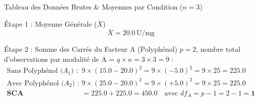 \documentclass[11pt,a4paper]{article}
\begin{document}
\begin{stepbox}{Tableau des Données Brutes \& Moyennes par Condition ($n=3$)}
\begin{center}
\end{center}
\end{stepbox}

\begin{stepbox}{Étape 1 : Moyenne Générale ($\bar{X}$)}
\begin{equation*}
\bar{X} = 20.0\,\text{U/mg}
\end{equation*}
\end{stepbox}

\begin{stepbox}{Étape 2 : Somme des Carrés du Facteur A (Polyphénol)}
$p = 2$, nombre total d'observations par modalité de A = $q \times n = 3 \times 3 = 9$ :
\begin{align*}
\text{Sans Polyphénol ($A_1$) :} \quad & 9 \times (15.0 - 20.0)^2 = 9 \times (-5.0)^2 = 9 \times 25 = 225.0 \\
\text{Avec Polyphénol ($A_2$) :} \quad & 9 \times (25.0 - 20.0)^2 = 9 \times (+5.0)^2 = 9 \times 25 = 225.0 \\[2mm]
\mathbf{SCA} &= 225.0 + 225.0 = \mathbf{450.0} \quad \text{avec } df_A = p - 1 = 2 - 1 = \mathbf{1}
\end{align*}
\end{stepbox}
\end{document}
